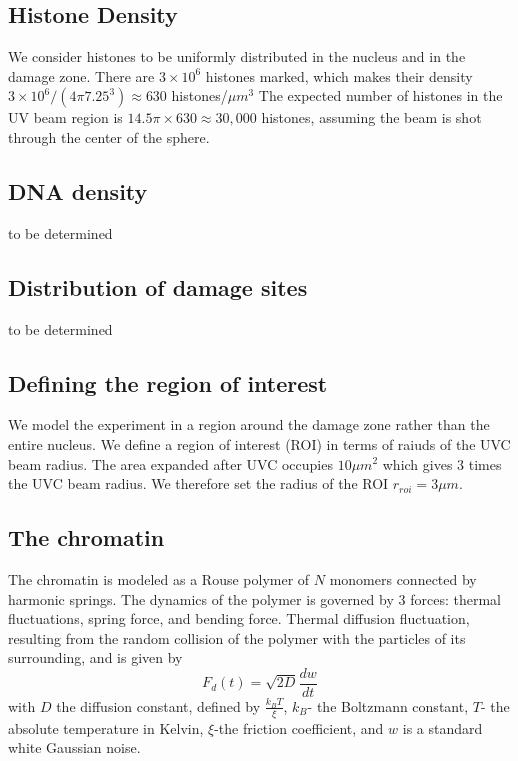 \documentclass[12pt]{report}
\begin{document}
    \subsection{Histone Density}
		We consider histones to be uniformly distributed in the nucleus and in the damage zone. There are $3\times 10^6$ histones marked, which makes their density $3\times 10^6 /(4 \pi 7.25^3)\approx 630$ histones/$\mu m^3$
		The expected number of histones in the UV beam region is $14.5\pi \times 630\approx 30,000$ histones, assuming the beam is shot through the center of the sphere. 
    
    \subsection{DNA density}
	to be determined	
	
	\subsection{Distribution of damage sites}
	to be determined
	
	\subsection{Defining the region of interest}
	We model the experiment in a region around the damage zone rather than the entire nucleus. We define a region of interest (ROI) in terms of raiuds of the UVC beam radius. The area expanded after UVC occupies $10 \mu m^2$ which gives 3 times the UVC beam radius. We therefore set the radius of the ROI $r_{roi}=3\mu m$.
					    
	\subsection{The chromatin}	
     The chromatin is modeled as a Rouse polymer of $N$ monomers connected by harmonic springs. The dynamics of the polymer is governed by 3 forces: thermal fluctuations, spring force, and bending force.
     Thermal diffusion fluctuation, resulting from the random collision of the polymer with the particles of its surrounding, and is given by 
     \begin{equation*}
     F_d(t) = \sqrt{2D}\frac{dw}{dt}
     \end{equation*}
      with $D$ the diffusion constant, defined by $\frac{k_BT}{\xi}$, $k_B$- the Boltzmann constant, $T$- the absolute temperature in Kelvin, $\xi$-the friction coefficient, and $w$ is a standard white Gaussian noise. 
            
\end{document}
